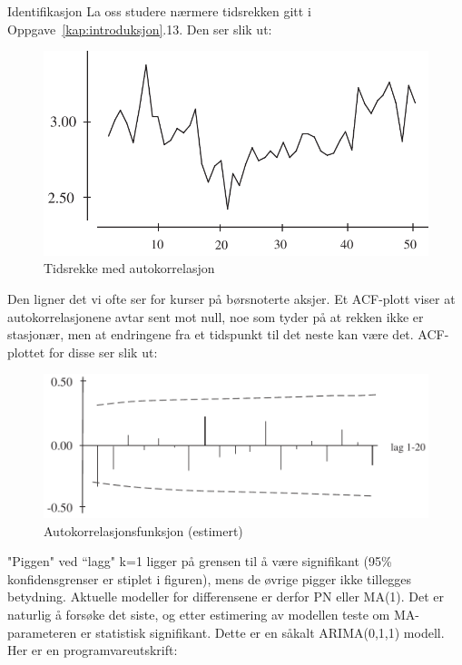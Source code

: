 \begin{eksempel}{Identifikasjon}
La oss studere nærmere tidsrekken gitt i Oppgave~\ref*{kap:introduksjon}.13. 
Den ser slik ut:

\begin{figure}[ht]
\centering
   \includegraphics[scale=0.8]{figurer/fig13_8.pdf} 
 \caption{Tidsrekke med autokorrelasjon}
	\label{fig:tidsrekke_acf}
\end{figure}

\noindent
Den ligner det vi ofte ser for kurser på børsnoterte aksjer.
Et ACF-plott viser at autokorrelasjonene avtar sent mot null, noe som tyder
på at rekken ikke er stasjonær, men at endringene fra et tidspunkt
til det neste kan være det. ACF-plottet for disse ser slik ut:

\begin{figure}[ht]
\centering
   \includegraphics[scale=0.7]{figurer/fig13_9.pdf} 
 \caption{Autokorrelasjonsfunksjon (estimert)}
	\label{fig:}
\end{figure}

"Piggen" ved ``lagg" k=1 ligger på grensen til å være signifikant
(95\% konfidensgrenser er stiplet i figuren), mens de øvrige pigger ikke
tillegges betydning. Aktuelle modeller for differensene er derfor
PN eller MA(1). Det er naturlig å forsøke det siste, og etter
estimering av modellen teste om MA-parameteren er statistisk signifikant.
Dette er en såkalt ARIMA(0,1,1) modell. Her er en programvareutskrift:
\begin{center} \framebox[10cm]{\begin{minipage}{9cm}\rule[-0.5cm]{0cm}{0.5cm}
\tt 


\end{minipage}}
\end{center}
\end{eksempel}
